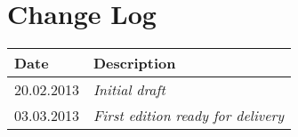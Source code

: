\section{Change Log}
\label{sec:changelog}
\begin{tabular}{|l|l|}
\hline
Date & Description \\ \hline
20.02.2013 & {\em Initial draft} \\ \hline
03.03.2013 & {\em First edition ready for delivery} \\ \hline
\end{tabular}
